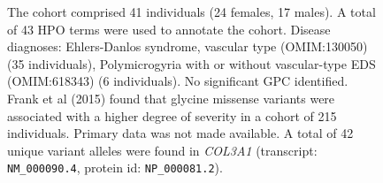 \begin{figure}[htbp]
    \vspace{2em}
    
    \caption{ The cohort comprised 41 individuals (24 females, 17 males). A total of 43 HPO terms were used to annotate the cohort. Disease diagnoses: Ehlers-Danlos syndrome, vascular type (OMIM:130050) (35 individuals), Polymicrogyria with or without vascular-type EDS (OMIM:618343) (6 individuals). No significant GPC identified. Frank et al (2015) found that glycine missense variants were associated with a higher degree of severity in a cohort of 215 individuals. Primary data was not made available. A total of 42 unique variant alleles were found in \textit{COL3A1} (transcript: \texttt{NM\_000090.4}, protein id: \texttt{NP\_000081.2}).}
    \end{figure}
    